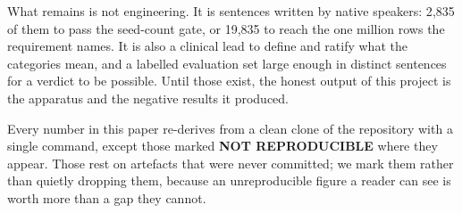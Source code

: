 What remains is not engineering. It is sentences written by native speakers:
2{,}835 of them to pass the seed-count gate, or 19{,}835 to reach the one
million rows the requirement names. It is also a clinical lead to define and
ratify what the categories mean, and a labelled evaluation set large enough in
distinct sentences for a verdict to be possible. Until those exist, the honest output of this project is the apparatus
and the negative results it produced.

Every number in this paper re-derives from a clean clone of the repository with a
single command, except those marked \textbf{NOT REPRODUCIBLE} where they appear.
Those rest on artefacts that were never committed; we mark them rather than
quietly dropping them, because an unreproducible figure a reader can see is
worth more than a gap they cannot.
